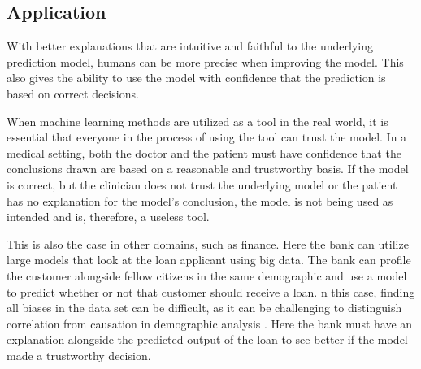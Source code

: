 \subsection{Application}

With better explanations that are intuitive and faithful to the underlying prediction model, humans can be more precise when improving the model. This also gives the ability to use the model with confidence that the prediction is based on correct decisions.


When machine learning methods are utilized as a tool in the real world, it is essential that everyone in the process of using the tool can trust the model. 
In a medical setting, both the doctor and the patient must have confidence that the conclusions drawn are based on a reasonable and trustworthy basis. If the model is correct, but the clinician does not trust the underlying model or the patient has no explanation for the model's conclusion, the model is not being used as intended and is, therefore, a useless tool.

This is also the case in other domains, such as finance. Here the bank can utilize large models that look at the loan applicant using big data. The bank can profile the customer alongside fellow citizens in the same demographic and use a model to predict whether or not that customer should receive a loan. n this case, finding all biases in the data set can be difficult, as it can be challenging to distinguish correlation from causation in demographic analysis \cite{garciaHarmsDemographicBias2019}. Here the bank must have an explanation alongside the predicted output of the loan to see better if the model made a trustworthy decision. 




